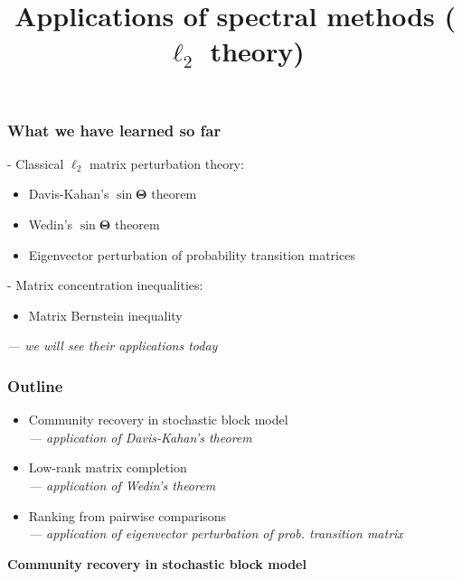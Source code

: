 \documentclass[compress,
mathserif,wide,%
]{beamer}
\title %
{Applications of spectral methods ($\ell_{2}$ theory)}
\begin{document}
\begin{frame}[plain]
  \titlepage

\end{frame}

\begin{frame}
	\frametitle{What we have learned so far}
	
	- Classical $\ell_{2}$ matrix perturbation theory: 
	\begin{itemize}
		\item Davis-Kahan's $\sin \bm{\Theta}$ theorem 				\item Wedin's $\sin \bm{\Theta}$ theorem 		
		\item Eigenvector perturbation of probability transition matrices
	\end{itemize}
	
	\vfill 
	- Matrix concentration inequalities:
	\begin{itemize}
		\item Matrix Bernstein inequality
	\end{itemize}
	
	\vfill
	\pause
	{\hfill \em --- we will see their applications today}
\end{frame}

\begin{frame}
\frametitle{Outline}

\begin{itemize}
  \itemsep1em
  \item Community recovery in stochastic block model \\
  	{\footnotesize \hfill \em --- application of Davis-Kahan's theorem}
  \item Low-rank matrix completion \\
  	{\footnotesize \hfill \em --- application of Wedin's theorem}
  \item Ranking from pairwise comparisons \\
  	{\footnotesize \hfill \em --- application of eigenvector perturbation of prob. transition matrix}
\end{itemize}

\end{frame}


\begin{frame}[plain]
	\vfill
	\centering
	\Large \bf Community recovery in stochastic block model
	\vfill
\end{frame}
\end{document}
